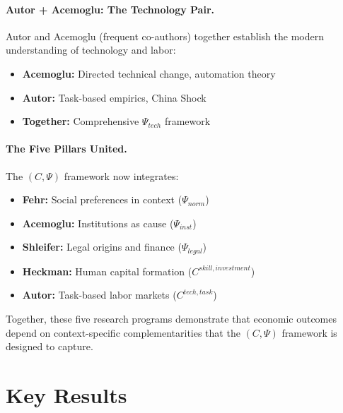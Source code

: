 \paragraph{Autor + Acemoglu: The Technology Pair.}
Autor and Acemoglu (frequent co-authors) together establish the modern
understanding of technology and labor:
\begin{itemize}
  \item \textbf{Acemoglu:} Directed technical change, automation theory
  \item \textbf{Autor:} Task-based empirics, China Shock
  \item \textbf{Together:} Comprehensive $\Psi_{tech}$ framework
\end{itemize}

\paragraph{The Five Pillars United.}
The $(C, \Psi)$ framework now integrates:
\begin{itemize}
  \item \textbf{Fehr:} Social preferences in context ($\Psi_{norm}$)
  \item \textbf{Acemoglu:} Institutions as cause ($\Psi_{inst}$)
  \item \textbf{Shleifer:} Legal origins and finance ($\Psi_{legal}$)
  \item \textbf{Heckman:} Human capital formation ($C^{skill,investment}$)
  \item \textbf{Autor:} Task-based labor markets ($C^{tech,task}$)
\end{itemize}

Together, these five research programs demonstrate that economic outcomes
depend on context-specific complementarities that the $(C, \Psi)$ framework
is designed to capture.




\section{Key Results}
\label{sec:aut-results}

